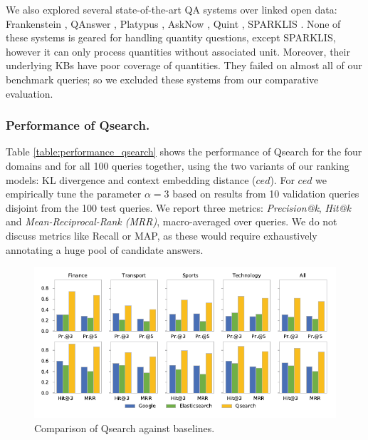 We also explored several state-of-the-art QA systems over linked open data:
Frankenstein
\cite{DBLP:conf/www/SinghRBSLUVKP0V18},
QAnswer
\cite{DBLP:conf/www/DiefenbachMQLSM19},
Platypus
\cite{DBLP:conf/esws/TanonACS18},
AskNow
\cite{DBLP:conf/esws/DubeyDSHL16}, 
Quint
\cite{DBLP:conf/emnlp/AbujabalRYW17},
SPARKLIS
\cite{DBLP:journals/semweb/Ferre17}.
None of these systems is geared for handling quantity questions, except SPARKLIS, however it can only process quantities without associated unit.
Moreover, their underlying KBs have poor coverage of quantities.
They failed on almost all of our benchmark queries; so we excluded these systems from our comparative evaluation. 


\subsubsection{Performance of Qsearch. } 
Table \ref{table:performance_qsearch} shows the performance of Qsearch for the four domains and
for all 100 queries together, using the two variants of our ranking models:
KL divergence and context embedding distance ($ced$).
For $ced$ we empirically tune the parameter $\alpha = 3$  based on results from 10
validation queries
disjoint from the 100 test queries. 
We report three metrics: \textit{Precision@k}, \textit{Hit@k} and \textit{Mean-Reciprocal-Rank (MRR)}, 
macro-averaged over queries. 
We do not discuss metrics like Recall or MAP, as these would require exhaustively annotating a huge pool
of candidate answers.



\begin{figure}[t]
	\includegraphics[width= 1\textwidth]{figures/compare.pdf}
	\caption{Comparison of Qsearch against baselines.}
	\label{fig:top-3_comparison}
\end{figure}


